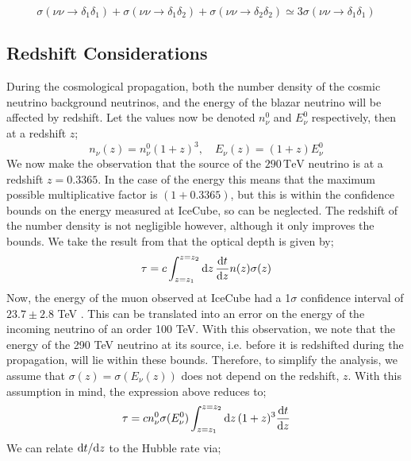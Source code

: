 \begin{equation}
  \sigma(\nu\nu \rightarrow \delta_1 \delta_1) + \sigma(\nu\nu \rightarrow \delta_1 \delta_2) + \sigma(\nu\nu \rightarrow \delta_2 \delta_2) \simeq 3 \sigma(\nu\nu \rightarrow \delta_1 \delta_1)
\end{equation}



\subsection{Redshift Considerations}



During the cosmological propagation, both the number density of the cosmic neutrino background neutrinos, and the energy of the blazar neutrino will be affected by redshift. Let the values now be denoted $n_\nu^0$ and $E_\nu^0$ respectively, then at a redshift $z$;
\begin{equation}
  n_\nu(z) = n_\nu^0 (1 + z)^3, \quad E_\nu(z) = (1 + z)E_\nu^0
\end{equation}
We now make the observation that the source of the $290 \, \textrm{TeV}$ neutrino is at a redshift $z = 0.3365$. In the case of the energy this means that the maximum possible multiplicative factor is $(1 + 0.3365)$, but this is within the confidence bounds on the energy measured at IceCube, so can be neglected. The redshift of the number density is not negligible however, although it only improves the bounds. We take the result from \cite{Farzan2014} that the optical depth is given by;
\begin{equation}
  \tau = c\int_{z = z_1}^{z = z_2}{\mathrm{d}z\,\frac{\mathrm{d} t}{\mathrm{d} z}n(z)\sigma(z)}
\end{equation}
Now, the energy of the muon observed at IceCube had a 1$\sigma$ confidence interval of $23.7 \pm 2.8$ TeV \cite{IceCube2018}. This can be translated into an error on the energy of the incoming neutrino of an order 100 TeV. With this observation, we note that the energy of the 290 TeV neutrino at its source, i.e. before it is redshifted during the propagation, will lie within these bounds. Therefore, to simplify the analysis, we assume that $\sigma(z) = \sigma(E_\nu(z))$ does not depend on the redshift, $z$. With this assumption in mind, the expression above reduces to; 
\begin{equation}
  \tau = c n_\nu^0 \sigma(E_\nu^0) \int_{z = z_1}^{z = z_2}{\mathrm{d}z\,(1 + z)^3 \frac{\mathrm{d} t}{\mathrm{d} z}}
\end{equation}
We can relate $\mathrm{d} t/\mathrm{d} z$ to the Hubble rate via;
